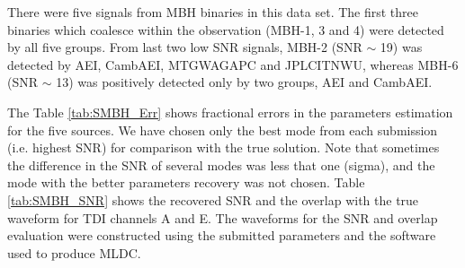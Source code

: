 \documentclass{iopart}
\begin{document}
There were five signals from MBH binaries in this data set. The first three binaries which coalesce within the 
observation (MBH-1, 3 and 4) were detected by all five groups. From last two low SNR signals, MBH-2 (SNR $\sim$ 19) was detected by AEI, CambAEI, MTGWAGAPC and JPLCITNWU, whereas MBH-6 (SNR $\sim$ 13) was positively detected only by two groups, AEI and CambAEI.  

The Table \ref{tab:SMBH_Err} shows fractional errors in the parameters estimation for the five sources. We have chosen only the best mode from each submission (i.e. highest SNR) for comparison with the true solution. Note that 
sometimes the difference in the SNR of several modes was less that one (sigma), and the mode with the better 
parameters recovery was not chosen.
Table \ref{tab:SMBH_SNR} shows the recovered SNR and the overlap with  the true waveform for TDI channels A and E. The waveforms for the SNR and overlap evaluation were constructed using the submitted parameters and the software
used to produce MLDC.
\end{document}
